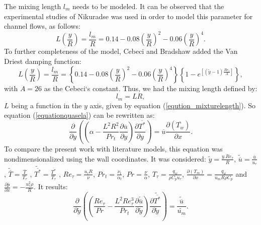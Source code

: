 \documentclass[10pt]{article} %
\begin{document}
The mixing length $ l_m $ needs to be modeled. It can be observed that the experimental studies of Nikuradse was used in order to model this parameter for channel flows, as follows:
\begin{equation}
L\left(\frac{y}{R}\right) = \frac{l_m}{R} = 0.14 - 0.08 \left(\frac{y}{R}\right)^2 - 0.06\left(\frac{y}{R}\right)^4.
\end{equation}
To further completeness of the model, Cebeci and Bradshaw added the Van Driest damping function:
\begin{equation}\label{eqution_mixturelength}
L\left(\frac{y}{R}\right)  = \frac{l_m}{R} = \left\{ 0.14 - 0.08 \left(\frac{y}{R}\right)^2 - 0.06\left(\frac{y}{R}\right)^4\right\}\left\{  1 - e^{[(\tilde{y} - 1) \frac{Re_\tau}{A}]}\right\},
\end{equation}
with $A = 26$ as the Cebeci`s constant. Thus, we had the mixing length defined by:
\begin{equation}
l_m = L R,
\end{equation}
$ L $ being a function in the $ y $ axis, given by equation (\ref{eqution_mixturelength}). So equation (\ref{equationquasela}) can be rewritten as:
\begin{equation}\label{cebeciconstant}
{\frac{\partial{}}{\partial{y}}} \left( \left( \alpha   
- \frac{{L}^2 R ^2}{Pr_t}\frac{\partial \overline{u}}{\partial y} \right) \frac{\partial \overline{T^\ast}}{\partial y} \right)
= 
\overline{u}\frac{\partial{}\left(\overline{T_w}\right)  }{\partial{x}}.
\end{equation}
 To compare the present work with literature models, this equation was nondimensionalized using the wall coordinates. It was considered: $ \tilde{y} = \frac{y . Re_\tau}{R} $, $ \tilde{\overline{u}} = \frac{\overline{u}}{u_\tau} $ , $ \tilde{\overline{T}} = \frac{\overline{T}}{T_\tau} $ , $ \tilde{\overline{T^\ast}} = \frac{\overline{T^\ast}}{T_\tau} $ , $Re_\tau = \frac{u_\tau R}{\nu}$, $Pr_t = \frac{\nu_t}{\alpha_t}$, $Pr = \frac{\nu}{\alpha}$, $T_\tau = \frac{q_w}{\rho C_p u_\tau}$, $\frac{\partial{\left(T_m\right)}}{\partial{x}} = \frac{q_w}{u_m  R \rho  C_p } $ and $\frac{\partial \overline{p}}{\partial x} = - \frac{u_\tau^2 \rho}{R} $. It results:
\\
\begin{equation}\label{equationultima}
{\frac{\partial{}}{\partial{\tilde{y}}}} \left( \left( \frac{Re_\tau}{Pr}   
- \frac{{L}^2 Re_\tau ^3}{Pr_t}\frac{\partial \tilde{\overline{u}}}{\partial \tilde{y}} \right) \frac{\partial \tilde{\overline{T^\ast}}}{\partial \tilde{y}} \right)
= 
\frac{\tilde{\overline{u}}}{\tilde{u_m}}.
\end{equation}
\end{document}
